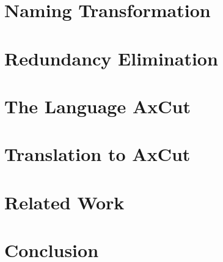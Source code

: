 \documentclass[nonacm]{acmart}
\begin{document}
\section{Naming Transformation}
\label{sec:naming-transformation}


\section{Redundancy Elimination}
\label{sec:redundancy-elimination}


\section{The Language AxCut}
\label{sec:axcut}


\section{Translation to AxCut}
\label{sec:toaxcut}


\section{Related Work}
\label{sec:related-work}


\section{Conclusion}
\label{sec:conclusion}



\end{document}
